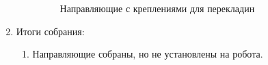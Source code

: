 \begin{enumerate}
\begin{enumerate}
\begin{figure}[H]
\begin{minipage}[h]{0.47\linewidth}
      	\end{minipage}
      	\caption{Направляющие с креплениями для перекладин}
      \end{figure}
      
    \end{enumerate}
    
	\item Итоги собрания: \newline
	\begin{enumerate}
	  \item Направляющие собраны, но не установлены на робота.\newline


\end{enumerate}
\end{enumerate}
